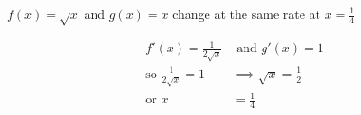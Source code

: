 \documentclass[14pt,fleqn]{extarticle}
\begin{document}
 
\begin{snippet}
    \correct
    
    $f(x) = \sqrt{x}$ and $g(x) = x$ change at the same rate at $x=\frac{1}{4}$ 
    \reason
    
    \begin{align}
	f'(x) = \frac{1}{2\sqrt{x}}&\text{ and } g'(x) = 1  \\
	\text{so } \frac{1}{2\sqrt{x}} = 1&\implies \sqrt{x} = \frac{1}{2} \\
	\text{or } x &= \frac{1}{4} 
\end{align}
    
\end{snippet} 
\end{document}
